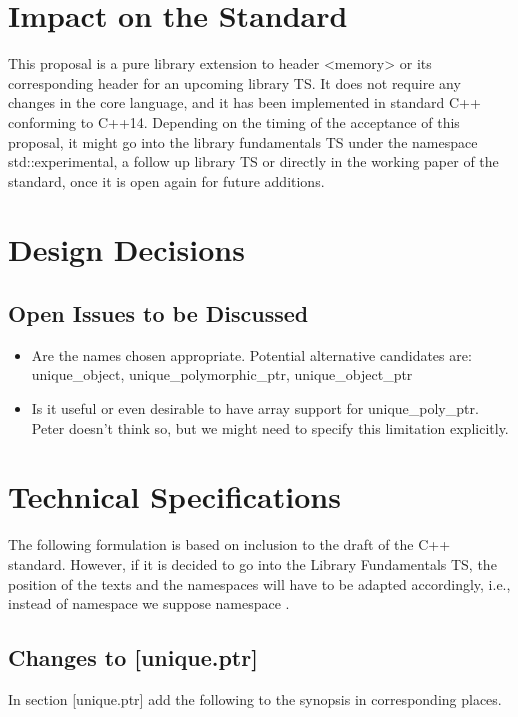 \documentclass[ebook,11pt,article]{memoir}
\begin{document}
\chapter{Impact on the Standard}
This proposal is a pure library extension to header <memory> or its corresponding header for an upcoming library TS.  It does not require any changes in the core language, and it has been implemented in standard C++ conforming to C++14. Depending on the timing of the acceptance of this proposal, it might go into the library fundamentals TS under the namespace std::experimental, a follow up library TS or directly in the working paper of the standard, once it is open again for future additions.

\chapter{Design Decisions}

\section{Open Issues to be Discussed}
\begin{itemize}
\item Are the names chosen appropriate. Potential alternative candidates are: unique_object, unique_polymorphic_ptr, unique_object_ptr
\item Is it useful or even desirable to have array support for unique_poly_ptr. Peter doesn't think so, but we might need to specify this limitation explicitly.
\end{itemize}


\chapter{Technical Specifications}
The following formulation is based on inclusion to the draft of the C++ standard. However, if it is decided to go into the Library Fundamentals TS, the position of the texts and the namespaces will have to be adapted accordingly, i.e., instead of namespace  we suppose namespace .

\section{Changes to [unique.ptr] }
In section [unique.ptr] add the following to the  synopsis in corresponding places.
\end{document}
